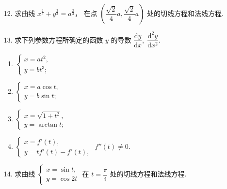 \begin{enumerate}
    \item[12.] 求曲线 $x^{\frac{2}{3}}+y^{\frac{2}{3}}=a^{\frac{2}{3}}$，
    在点 $\left(\dfrac{\sqrt{2}}{4}a,\dfrac{\sqrt{2}}{4}a\right)$ 处的切线方程和法线方程.

    \item[13.] 求下列参数方程所确定的函数 $y$ 的导数 $\dfrac{\text{d}y}{\text{d}x},\;\dfrac{\text{d}^2y}{\text{d}x^2}$.
    \begin{enumerate}[(1)]\setlength{\itemsep}{5pt}\setlength{\topsep}{15pt}
        \item $\begin{cases}
            x=at^2,\\
            y=bt^3;
        \end{cases}$
        \item $\begin{cases}
            x=a\cos t,\\
            y=b\sin t;
        \end{cases}$
        \item $\begin{cases}
            x=\sqrt{1+t^2},\\
            y=\arctan t;
        \end{cases}$
        \item $\begin{cases}
            x=f'(t),\\
            y=tf'(t)-f'(t),
        \end{cases}$ $f''(t)\not=0$.
    \end{enumerate}

    \item[14.] 求曲线 $\begin{cases}
        x=\sin t,\\
        y=\cos 2t
    \end{cases}$  
    在 $t=\dfrac{\pi}{4}$ 处的切线方程和法线方程.

\end{enumerate}
